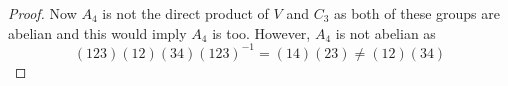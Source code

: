 \documentclass[12pt]{article}
\begin{document}
\begin{enumerate}
\begin{proof}
        Now $A_4$ is not the direct product of $V$ and $C_3$ as both of these groups
        are abelian and this would imply $A_4$ is too. However, $A_4$ is not abelian as
        \[ (123)(12)(34)(123)^{-1} = (14)(23) \neq (12)(34) \]
    \end{proof}
\end{enumerate}
\end{document}
